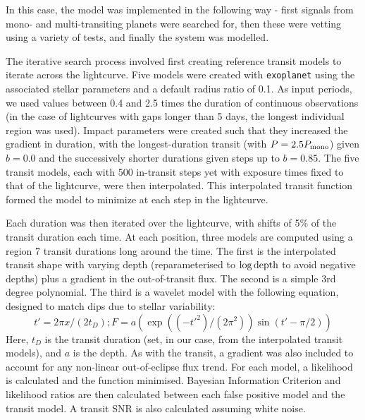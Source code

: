 \documentclass{article}
\begin{document}
In this case, the model was implemented in the following way - first signals from mono- and multi-transiting planets were searched for, then these were vetting using a variety of tests, and finally the system was modelled.

The iterative search process involved first creating reference transit models to iterate across the lightcurve.
Five models were created with \texttt{exoplanet} using the associated stellar parameters and a default radius ratio of 0.1.
As input periods, we used values between 0.4 and 2.5 times the duration of continuous observations (in the case of lightcurves with gaps longer than 5 days, the longest individual region was used).
Impact parameters were created such that they increased the gradient in duration, with the longest-duration transit (with $P=2.5P_{\rm mono}$) given $b=0.0$ and the successively shorter durations given steps up to $b=0.85$.
The five transit models, each with 500 in-transit steps yet with exposure times fixed to that of the lightcurve, were then interpolated.
This interpolated transit function formed the model to minimize at each step in the lightcurve.

Each duration was then iterated over the lightcurve, with shifts of 5\% of the transit duration each time.
At each position, three models are computed using a region 7 transit durations long around the time. The first is the interpolated transit shape with varying depth (reparameterised to $\log{\rm depth}$ to avoid negative depths) plus a gradient in the out-of-transit flux. The second is a simple 3rd degree polynomial. The third is a wavelet model with the following equation, designed to match dips due to stellar variability:
\begin{equation}
t' = 2\pi x / (2 t_D);  
F = {a}(\exp{((-t'^2) / (2\pi^2))}\sin{(t'-\pi/2)})
\end{equation}
Here, $t_D$ is the transit duration (set, in our case, from the interpolated transit models), and $a$ is the depth. As with the transit, a gradient was also included to account for any non-linear out-of-eclipse flux trend. 
For each model, a likelihood is calculated and the function minimised. Bayesian Information Criterion and likelihood ratios are then calculated between each false positive model and the transit model. A transit SNR is also calculated assuming white noise.
\end{document}
